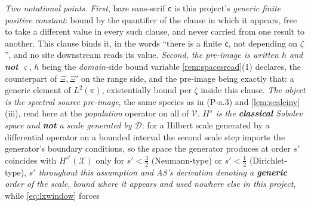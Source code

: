 \emph{Two notational points.} \emph{First}, bare sans-serif $\mathsf c$ is this project's \emph{generic
finite positive constant}: bound by the quantifier of the clause in which it appears, free to take a
different value in every such clause, and never carried from one result to another. This clause binds it,
in the words ``there is a finite $\mathsf c$, not depending on $\zeta$'', and no site downstream reads its
value.
\emph{Second, the pre-image is written $h$ and \textbf{not} $\varsigma$}, $h$ being the
\emph{domain}-side bound variable \cref{rem:spacesread}\textup{(1)} declares, the counterpart of
$\Xi,\Xi'$ on the range side, and the pre-image being exactly that: a generic element of $L^{2}(\pi)$, existentially
bound per $\zeta$ inside this clause. \emph{The object is the spectral source pre-image}, the same species
as in (P-a.3) and \cref{lem:scaleinv}\textup{(iii)}, read here at the \emph{population} operator on all of
$\mathcal V$.
\emph{$H^{s}$ is the \textbf{classical} Sobolev space and \textbf{not} a scale generated by
$\mathcal D$}: for a Hilbert scale generated by a
differential operator on a bounded interval the second scale step imports the generator's boundary
conditions, so the space the generator produces at order $s'$ coincides with $H^{s'}(\mathcal X)$
only for
$s'<\tfrac32$ (Neumann-type) or $s'<\tfrac12$ (Dirichlet-type), \emph{$s'$ throughout this assumption
and A8's derivation denoting a \textbf{generic} order of the scale, bound where it appears
and used nowhere else in this project}, while \eqref{eq:lxwindow} forces
